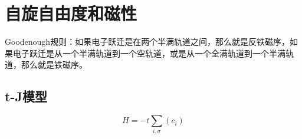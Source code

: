 \section{自旋自由度和磁性}

Goodenough规则：如果电子跃迁是在两个半满轨道之间，那么就是反铁磁序，如果电子跃迁是从一个半满轨道到一个空轨道，或是从一个全满轨道到一个半满轨道，那么就是铁磁序。

\subsection{t-J模型}

\begin{equation}
    H = - t \sum_{i, \sigma} (c_i)
\end{equation}